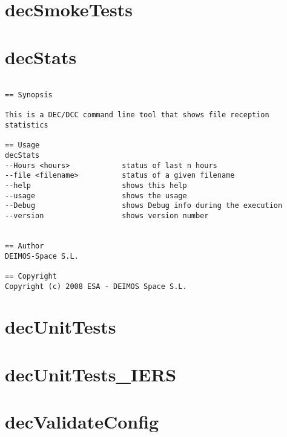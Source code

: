 \documentclass[dec_sum_main.tex]{subfiles}
\begin{document}
\section{decSmokeTests}

\label{decStats}
\section{decStats}

\begin{verbatim}

== Synopsis

This is a DEC/DCC command line tool that shows file reception statistics  

== Usage
decStats
--Hours <hours>            status of last n hours
--file <filename>          status of a given filename
--help                     shows this help
--usage                    shows the usage
--Debug                    shows Debug info during the execution
--version                  shows version number


== Author
DEIMOS-Space S.L.

== Copyright
Copyright (c) 2008 ESA - DEIMOS Space S.L.

\end{verbatim}

\section{decUnitTests}

\section{decUnitTests\_IERS}

\section{decValidateConfig}
\end{document}
